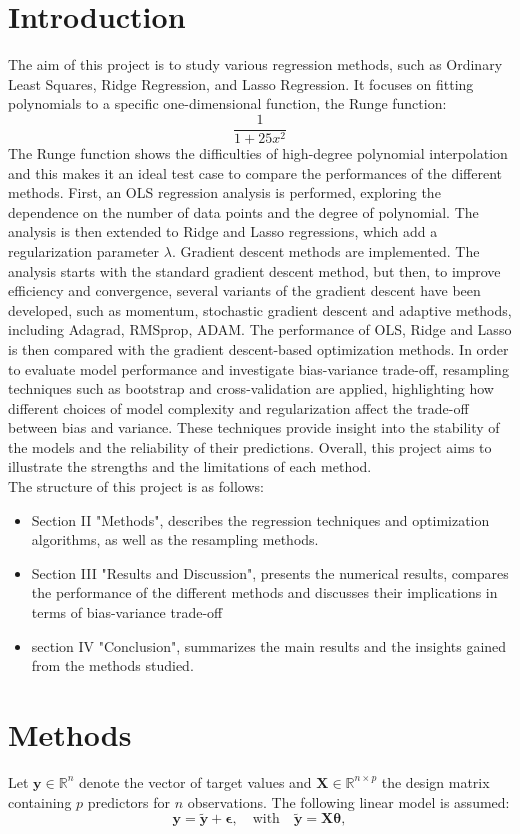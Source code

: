 \documentclass[
 reprint,            %
 amsmath,amssymb,
 aps,
]{revtex4-2}
\begin{document}
\section{Introduction}
The aim of this project is to study various regression methods, such as Ordinary Least Squares, Ridge Regression, and Lasso Regression. It focuses on fitting polynomials to a specific one-dimensional function, the Runge function:
\[
\frac{1}{1+25x^2}
\]
The Runge function shows the difficulties of high-degree polynomial interpolation and this makes it an ideal test case to compare the performances of the different methods.
First, an OLS regression analysis is performed, exploring the dependence on the number of data points and the degree of polynomial. The analysis is then extended to Ridge and Lasso regressions, which add a regularization parameter ${\lambda}$. Gradient descent methods are implemented. The analysis starts with the standard gradient descent method, but then, to improve efficiency and convergence, several variants of the gradient descent have been developed, such as momentum, stochastic gradient descent and adaptive methods, including Adagrad, RMSprop, ADAM. The performance of OLS, Ridge and Lasso is then compared with the gradient descent-based optimization methods. In order to evaluate model performance and investigate bias-variance trade-off, resampling techniques such as bootstrap and cross-validation are applied, highlighting how different choices of model complexity and regularization affect the trade-off between bias and variance. These techniques provide insight into the stability of the models and the reliability of their predictions. 
Overall, this project aims to illustrate the strengths and the limitations of each method.\\
The structure of this project is as follows: 
\begin{itemize}
    \item Section II "Methods", describes the regression techniques and optimization algorithms, as well as the resampling methods.
    \item Section III "Results and Discussion", presents the numerical results, compares the performance of the different methods and discusses their implications in terms of bias-variance trade-off
    \item section IV "Conclusion", summarizes the main results and the insights gained from the methods studied.
\end{itemize}


\section{Methods}
 Let $\mathbf{y} \in \mathbb{R}^n$ denote the vector of target values and $\mathbf{X} \in \mathbb{R}^{n \times p}$ the design matrix containing $p$ predictors for $n$ observations. The following linear model is assumed:
$$
\mathbf{y} = \tilde{\mathbf{y}} + \boldsymbol{\epsilon}, \quad \text{with} \quad \tilde{\mathbf{y}} = \mathbf{X}\boldsymbol{\theta},
$$
\end{document}
